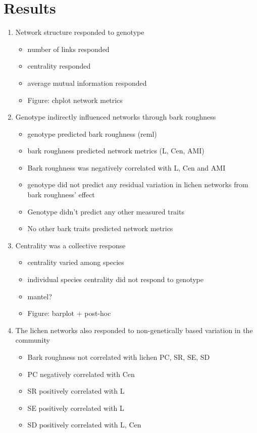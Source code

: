 \documentclass[11pt,twocolumn,twoside,lineno]{pnas-new}
\begin{document}
\showmatmethods{} %

\section*{Results}



\begin{enumerate}
\item Network structure responded to genotype 
  \begin{itemize}
  \item number of links responded
  \item centrality responded
  \item average mutual information responded
  \item Figure: chplot network metrics 
  \end{itemize}
\item Genotype indirectly influenced networks through bark roughness
  \begin{itemize}
  \item genotype predicted bark roughness (reml)
  \item bark roughness predicted network metrics (L, Cen, AMI)
  \item Bark roughness was negatively correlated with L, Cen and AMI
  \item genotype did not predict any residual variation in lichen
    networks from bark roughness' effect
  \item Genotype didn't predict any other measured traits
  \item No other bark traits predicted network metrics
  \end{itemize}
\item Centrality was a collective response
  \begin{itemize}
  \item centrality varied among species
  \item individual species centrality did not respond to genotype
  \item mantel?
  \item Figure: barplot + post-hoc
  \end{itemize}
\item The lichen networks also responded to non-genetically based
  variation in the community
  \begin{itemize}
  \item Bark roughness not correlated with lichen PC, SR, SE, SD
  \item PC negatively correlated with Cen
  \item SR positively correlated with L
  \item SE positively correlated with L
  \item SD positively correlated with L, Cen
  \end{itemize}
\end{enumerate}
\end{document}
